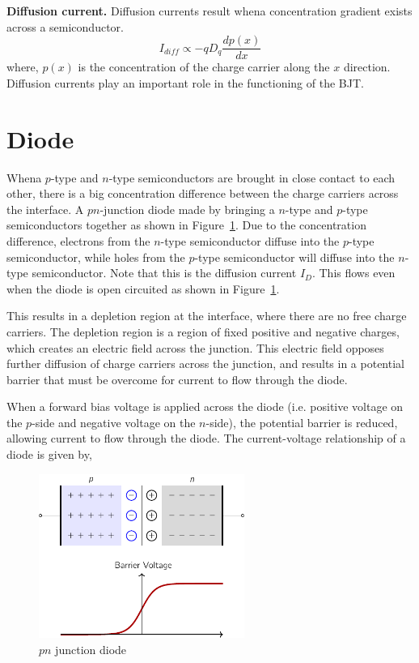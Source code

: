 \noindent\textbf{Diffusion current.} Diffusion currents result whena concentration gradient exists across a semiconductor.
\begin{equation}
    I_{diff} \propto -q D_q \frac{d p\left(x\right)}{dx}
    \label{eq:ch03-diff-current}
\end{equation}
where, $p\left(x\right)$ is the concentration of the charge carrier along the $x$ direction. Diffusion currents play an important role in the functioning of the BJT.

\section{Diode}
Whena  $p$-type and $n$-type semiconductors are brought in close contact to each other, there is a big concentration difference between the charge carriers across the interface. A $pn$-junction diode made by bringing a $n$-type and $p$-type semiconductors together as shown in Figure~\ref{fig:03-02}. Due to the concentration difference, electrons from the $n$-type semiconductor diffuse into the $p$-type semiconductor, while holes from the $p$-type semiconductor will diffuse into the $n$-type semiconductor. Note that this is the diffusion current $I_D$. This flows even when the diode is open circuited as shown in Figure~\ref{fig:03-02}. 

This results in a depletion region at the interface, where there are no free charge carriers. The depletion region is a region of fixed positive and negative charges, which creates an electric field across the junction. This electric field opposes further diffusion of charge carriers across the junction, and results in a potential barrier that must be overcome for current to flow through the diode. 

When a forward bias voltage is applied across the diode (i.e. positive voltage on the $p$-side and negative voltage on the $n$-side), the potential barrier is reduced, allowing current to flow through the diode. The current-voltage relationship of a diode is given by,


\begin{figure}[t]
    \centering
    \includegraphics[width=0.6\textwidth]{figure/ch03/fig03-02.pdf}
    \caption{$pn$ junction diode}
    \label{fig:03-02}
\end{figure}

